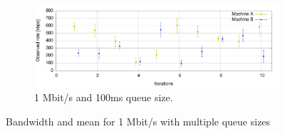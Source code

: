 \begin{figure}[htp]
        \begin{subfigure}[b]{1\textwidth}
                \centering
                \includegraphics[width=\textwidth]{./figures/1mb_01s_mean_deviation_bw.pdf}
      \caption[1 Mbit/s and 100ms queue size]{1 Mbit/s and 100ms queue size.}
	\label{fig:1mb_01s_mean_deviation_bw}
        \end{subfigure}
        \caption{Bandwidth and mean for 1 Mbit/s with multiple queue sizes}
        \label{fig:1mb_mean_deviation_bw}
\end{figure}

